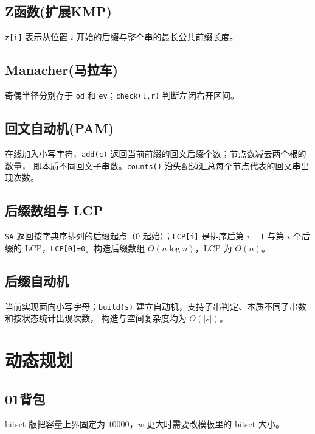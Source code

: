 \documentclass[11pt,a4paper,twocolumn]{ctexart}  %
\begin{document}


\subsection{Z函数(扩展KMP)}
\texttt{z[i]} 表示从位置 $i$ 开始的后缀与整个串的最长公共前缀长度。


\subsection{Manacher(马拉车)}
奇偶半径分别存于 \texttt{od} 和 \texttt{ev}；\texttt{check(l,r)} 判断左闭右开区间。


\subsection{回文自动机(PAM)}
在线加入小写字符，\texttt{add(c)} 返回当前前缀的回文后缀个数；节点数减去两个根的数量，
即本质不同回文子串数。\texttt{counts()} 沿失配边汇总每个节点代表的回文串出现次数。


\subsection{后缀数组与 LCP}
\texttt{SA} 返回按字典序排列的后缀起点（$0$ 起始）；\texttt{LCP[i]} 是排序后第
$i-1$ 与第 $i$ 个后缀的 LCP，\texttt{LCP[0]=0}。构造后缀数组 $O(n\log n)$，LCP 为 $O(n)$。


\subsection{后缀自动机}
当前实现面向小写字母；\texttt{build(s)} 建立自动机，支持子串判定、本质不同子串数和按状态统计出现次数，
构造与空间复杂度均为 $O(|s|)$。

\clearpage
\section{动态规划}

\subsection{01背包}


bitset 版把容量上界固定为 $10000$，$w$ 更大时需要改模板里的 bitset 大小。
\end{document}
